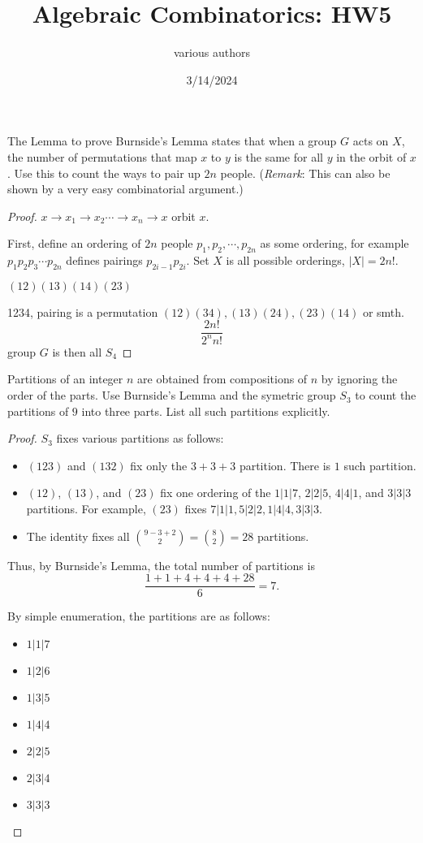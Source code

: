 \documentclass[11pt]{article}
\title{Algebraic Combinatorics: HW5}
\author{various authors}
\date{3/14/2024}
\begin{document}
\maketitle
\begin{quest}[\textcolor{red}{Pairing $2n$ people}]
    The Lemma to prove Burnside’s Lemma states that when a group $G$ acts on $X$, the number of permutations that map $x$ to $y$ is the same for all $y$ in the orbit of $x$. Use this to count the ways to pair up $2n$ people. (\textit{Remark}: This can also be shown by a very easy combinatorial argument.)
\end{quest}
\begin{proof}
    $x\to x_1\to x_2\cdots\to x_n\to x$ orbit $x$.

    First, define an ordering of $2n$ people $p_1,p_2,\cdots,p_{2n}$ as some ordering, for example $p_1p_2p_3\cdots p_{2n}$ defines pairings $p_{2i-1}p_{2i}$. Set $X$ is all possible orderings, $|X|=2n!$.

    $(12)(13)(14)(23)$

    1234, pairing is a permutation $(12)(34),(13)(24),(23)(14)$ or smth.
\[\frac{2n!}{2^n n!}\]
    group $G$ is then all $S_4$
\end{proof}
\begin{quest}
    Partitions of an integer $n$ are obtained from compositions of $n$ by ignoring the order of the parts. Use Burnside's Lemma and the symetric group $S_3$ to count the partitions of $9$ into three parts. List all such partitions explicitly.
\end{quest}
\begin{proof}
    $S_3$ fixes various partitions as follows:
    \begin{itemize}
        \item $(123)$ and $(132)$ fix only the $3+3+3$ partition. There is $1$ such partition.
        \item $(12)$, $(13)$, and $(23)$ fix one ordering of the $1|1|7$, $2|2|5$, $4|4|1$, and $3|3|3$ partitions. For example, $(23)$ fixes $7|1|1,5|2|2,1|4|4,3|3|3$.
        \item The identity fixes all $\binom{9-3+2}{2}=\binom{8}{2}=28$ partitions.
    \end{itemize}
    Thus, by Burnside's Lemma, the total number of partitions is
    \[\frac{1+1+4+4+4+28}{6}=\boxed{7}.\]

    By simple enumeration, the partitions are as follows:
    \begin{itemize}
        \item $1|1|7$
        \item $1|2|6$
        \item $1|3|5$
        \item $1|4|4$
        \item $2|2|5$
        \item $2|3|4$
        \item $3|3|3$
    \end{itemize}
\end{proof}
\end{document}
